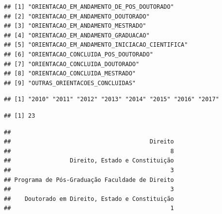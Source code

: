 \documentclass[]{article}
\newenvironment{Shaded}{\begin{snugshade}}{\end{snugshade}}
\newcommand{\KeywordTok}[1]{\textcolor[rgb]{0.13,0.29,0.53}{\textbf{#1}}}
\newcommand{\DataTypeTok}[1]{\textcolor[rgb]{0.13,0.29,0.53}{#1}}
\newcommand{\DecValTok}[1]{\textcolor[rgb]{0.00,0.00,0.81}{#1}}
\newcommand{\StringTok}[1]{\textcolor[rgb]{0.31,0.60,0.02}{#1}}
\newcommand{\OtherTok}[1]{\textcolor[rgb]{0.56,0.35,0.01}{#1}}
\newcommand{\OperatorTok}[1]{\textcolor[rgb]{0.81,0.36,0.00}{\textbf{#1}}}
\newcommand{\NormalTok}[1]{#1}
\begin{document}
\begin{verbatim}
## [1] "ORIENTACAO_EM_ANDAMENTO_DE_POS_DOUTORADO"    
## [2] "ORIENTACAO_EM_ANDAMENTO_DOUTORADO"           
## [3] "ORIENTACAO_EM_ANDAMENTO_MESTRADO"            
## [4] "ORIENTACAO_EM_ANDAMENTO_GRADUACAO"           
## [5] "ORIENTACAO_EM_ANDAMENTO_INICIACAO_CIENTIFICA"
## [6] "ORIENTACAO_CONCLUIDA_POS_DOUTORADO"          
## [7] "ORIENTACAO_CONCLUIDA_DOUTORADO"              
## [8] "ORIENTACAO_CONCLUIDA_MESTRADO"               
## [9] "OUTRAS_ORIENTACOES_CONCLUIDAS"
\end{verbatim}

\begin{Shaded}
\end{Shaded}

\begin{verbatim}
## [1] "2010" "2011" "2012" "2013" "2014" "2015" "2016" "2017"
\end{verbatim}

\begin{Shaded}
\end{Shaded}

\begin{verbatim}
## [1] 23
\end{verbatim}

\begin{Shaded}
\end{Shaded}

\begin{verbatim}
## 
##                                        Direito 
##                                              8 
##                 Direito, Estado e Constituição 
##                                              3 
## Programa de Pós-Graduação Faculdade de Direito 
##                                              3 
##    Doutorado em Direito, Estado e Constituição 
##                                              1
\end{verbatim}
\end{document}
